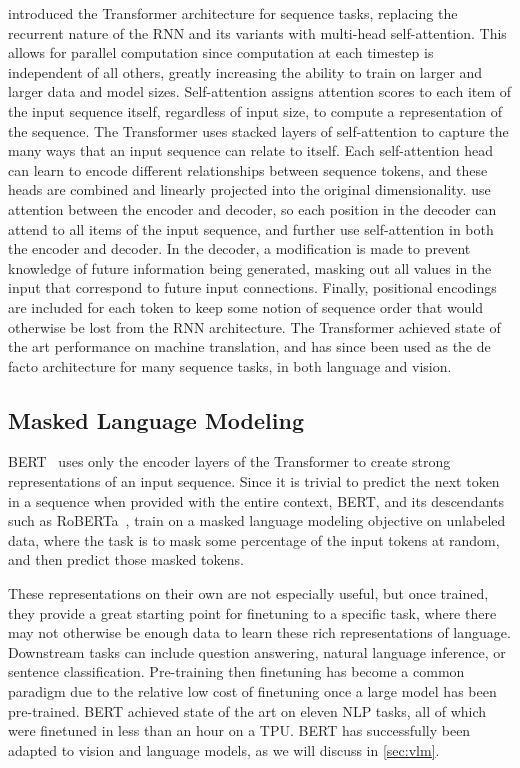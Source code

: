 \citet{vaswani2017attention} introduced the Transformer architecture for
sequence tasks, replacing the recurrent nature of the RNN and its variants with
multi-head self-attention. This allows for parallel computation since
computation at each timestep is independent of all others, greatly increasing
the ability to train on larger and larger data and model sizes. Self-attention
assigns attention scores to each item of the input sequence itself, regardless
of input size, to compute a representation of the sequence. The Transformer
uses stacked layers of self-attention to capture the many ways that an input
sequence can relate to itself. Each self-attention head can learn to encode
different relationships between sequence tokens, and these heads are combined
and linearly projected into the original dimensionality.
\citet{vaswani2017attention} use attention between the encoder and decoder, so
each position in the decoder can attend to all items of the input sequence, and
further use self-attention in both the encoder and decoder. In the decoder, a
modification is made to prevent knowledge of future information being
generated, masking out all values in the input that correspond to future input
connections. Finally, positional encodings are included for each token to keep
some notion of sequence order that would otherwise be lost from the RNN
architecture. The Transformer achieved state of the art performance on machine
translation, and has since been used as the de facto architecture for many
sequence tasks, in both language and vision.

\subsection{Masked Language Modeling}
\label{ssec:mlm}

BERT~\citep{devlin2019bert} uses only the encoder layers of the Transformer to
create strong representations of an input sequence. Since it is trivial to
predict the next token in a sequence when provided with the entire context,
BERT, and its descendants such as RoBERTa~\citep{liu2020roberta}, train on a
masked language modeling objective on unlabeled data, where the task is to mask
some percentage of the input tokens at random, and then predict those masked
tokens.

These representations on their own are not especially useful, but once trained,
they provide a great starting point for finetuning to a specific task, where
there may not otherwise be enough data to learn these rich representations of
language. Downstream tasks can include question answering, natural language
inference, or sentence classification. Pre-training then finetuning has become
a common paradigm due to the relative low cost of finetuning once a large model
has been pre-trained. BERT achieved state of the art on eleven NLP tasks, all
of which were finetuned in less than an hour on a TPU. BERT has successfully
been adapted to vision and language models, as we will discuss in
\cref{sec:vlm}.


